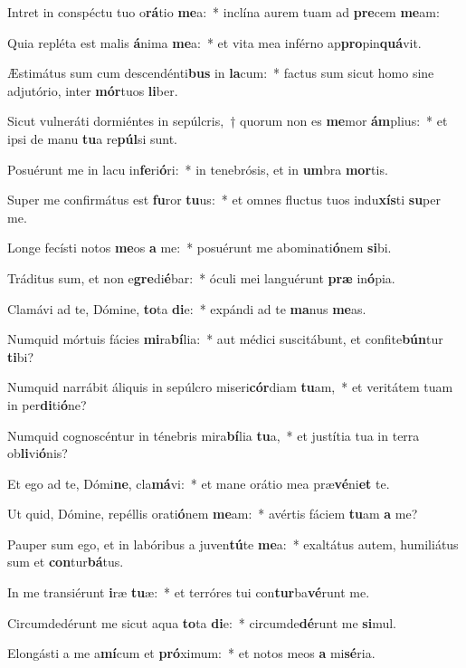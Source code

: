 \item Intret in conspéctu tuo o\textbf{rá}tio \textbf{me}a:~* inclína aurem tuam ad \textbf{pre}cem \textbf{me}am:
\item Quia repléta est malis \textbf{á}nima \textbf{me}a:~* et vita mea inférno ap\textbf{pro}pin\textbf{quá}vit.
\item Æstimátus sum cum descendénti\textbf{bus} in \textbf{la}cum:~* factus sum sicut homo sine adjutório, inter \textbf{mór}tuos \textbf{li}ber.
\item Sicut vulneráti dormiéntes in sepúlcris,~† quorum non es \textbf{me}mor \textbf{ám}plius:~* et ipsi de manu \textbf{tu}a re\textbf{púl}si sunt.
\item Posuérunt me in lacu in\textbf{fe}ri\textbf{ó}ri:~* in tenebrósis, et in \textbf{um}bra \textbf{mor}tis.
\item Super me confirmátus est \textbf{fu}ror \textbf{tu}us:~* et omnes fluctus tuos indu\textbf{xís}ti \textbf{su}per me.
\item Longe fecísti notos \textbf{me}os \textbf{a} me:~* posuérunt me abominati\textbf{ó}nem \textbf{si}bi.
\item Tráditus sum, et non e\textbf{gre}di\textbf{é}bar:~* óculi mei languérunt \textbf{præ} in\textbf{ó}pia.
\item Clamávi ad te, Dómine, \textbf{to}ta \textbf{di}e:~* expándi ad te \textbf{ma}nus \textbf{me}as.
\item Numquid mórtuis fácies \textbf{mi}ra\textbf{bí}lia:~* aut médici suscitábunt, et confite\textbf{bún}tur \textbf{ti}bi?
\item Numquid narrábit áliquis in sepúlcro miseri\textbf{cór}diam \textbf{tu}am,~* et veritátem tuam in per\textbf{di}ti\textbf{ó}ne?
\item Numquid cognoscéntur in ténebris mira\textbf{bí}lia \textbf{tu}a,~* et justítia tua in terra ob\textbf{li}vi\textbf{ó}nis?
\item Et ego ad te, Dómi\textbf{ne}, cla\textbf{má}vi:~* et mane orátio mea præ\textbf{vé}ni\textbf{et} te.
\item Ut quid, Dómine, repéllis orati\textbf{ó}nem \textbf{me}am:~* avértis fáciem \textbf{tu}am \textbf{a} me?
\item Pauper sum ego, et in labóribus a juven\textbf{tú}te \textbf{me}a:~* exaltátus autem, humiliátus sum et \textbf{con}tur\textbf{bá}tus.
\item In me transiérunt \textbf{i}ræ \textbf{tu}æ:~* et terróres tui con\textbf{tur}ba\textbf{vé}runt me.
\item Circumdedérunt me sicut aqua \textbf{to}ta \textbf{di}e:~* circumde\textbf{dé}runt me \textbf{si}mul.
\item Elongásti a me a\textbf{mí}cum et \textbf{pró}ximum:~* et notos meos \textbf{a} mi\textbf{sé}ria.
